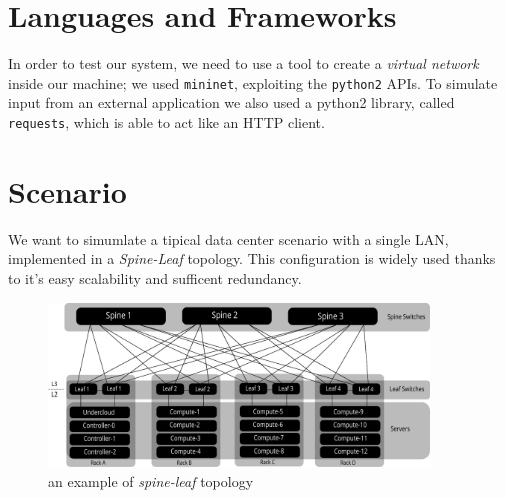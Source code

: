\section*{Languages and Frameworks}
In order to test our system, we need to use a tool to create a \textit{virtual network} inside our machine; we used \texttt{mininet}, 
exploiting the \texttt{python2} APIs. To simulate input from an external application we also used a python2 library, called \texttt{requests},
which is able to act like an HTTP client.

\section{Scenario}
We want to simumlate a tipical data center scenario with a single LAN, implemented in a \textit{Spine-Leaf} topology. This configuration
is widely used thanks to it's easy scalability and sufficent redundancy.
\begin{figure}[h]
    \caption{an example of \textit{spine-leaf} topology}
    \includegraphics[width=0.90\textwidth]{img/spine_leaf.pdf}
\end{figure}


